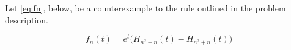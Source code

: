 \documentclass[a4paper,10pt,reqno]{amsart}
\numberwithin{equation}{section}
\newcommand{\lap}{\mathscr{L}}
\begin{document}









Let \eqref{eq:fn}, below, be a counterexample to the rule outlined in the problem description.

\begin{equation}\label{eq:fn}
     f_n(t) = e^t\big(H_{n^2 - n}(t) - H_{n^2 + n}(t)\big)
\end{equation}
\vspace{1pt}
\end{document}
